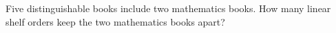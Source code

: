 Five distinguishable books include two mathematics books. How many linear shelf orders keep the two mathematics books apart?
